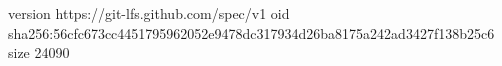 version https://git-lfs.github.com/spec/v1
oid sha256:56cfc673cc4451795962052e9478dc317934d26ba8175a242ad3427f138b25c6
size 24090
